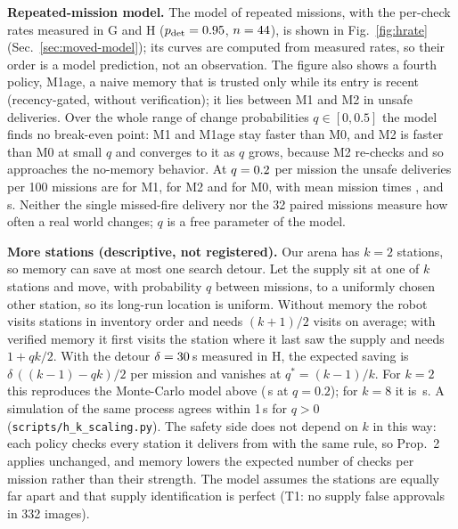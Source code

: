 \documentclass[conference]{IEEEtran}
\begin{document}
\textbf{Repeated-mission model.} The model of repeated missions, with the per-check rates measured in G and H ($p_{\mathrm{det}}=0.95$,
$n=44$), is shown in Fig.~\ref{fig:hrate} (Sec.~\ref{sec:moved-model}); its curves are computed from measured rates, so their order is a model prediction, not an observation.
The figure also shows a fourth policy, M1age, a naive memory that is trusted only while its entry is recent (recency-gated, without verification); it lies between M1 and M2 in unsafe deliveries. Over the whole range of change probabilities $q\in[0,0.5]$ the model finds no break-even point: M1 and M1age stay faster than M0,
and M2 is faster than M0 at small $q$ and converges to it as $q$ grows, because M2 re-checks and so approaches the no-memory behavior. At $q=0.2$ per mission the unsafe deliveries per 100 missions are
\HModelUnsafeone{} for M1, \HModelUnsafetwo{} for M2 and \HModelUnsafezero{} for M0, with mean mission times \HModelTimeone, \HModelTimetwo{} and \HModelTimezero\,s.
Neither the single missed-fire delivery nor the 32 paired missions measure how often a real world changes; $q$ is a free parameter of the model.

\textbf{More stations (descriptive, not registered).} Our arena has $k=2$ stations, so memory can save at most one search detour.
Let the supply sit at one of $k$ stations and move, with probability $q$ between missions, to a uniformly chosen other station,
so its long-run location is uniform. Without memory the robot visits stations in inventory order and needs $(k+1)/2$ visits on
average; with verified memory it first visits the station where it last saw the supply and needs $1+qk/2$. With the detour
$\delta=30$\,s measured in H, the expected saving is $\delta\,((k-1)-qk)/2$ per mission and vanishes at $q^\ast=(k-1)/k$.
For $k=2$ this reproduces the Monte-Carlo model above (\HKSaveTwo\,s at $q=0.2$); for $k=8$ it is \HKSaveEight\,s. A simulation of the same
process agrees within 1\,s for $q>0$ (\texttt{scripts/h\_k\_scaling.py}). The safety side does not depend on $k$ in this way:
each policy checks every station it delivers from with the same rule, so Prop.~2 applies unchanged, and memory lowers the
expected number of checks per mission rather than their strength. The model assumes the stations are equally far apart
and that supply identification is perfect (T1: no supply false approvals in 332 images).
\end{document}

